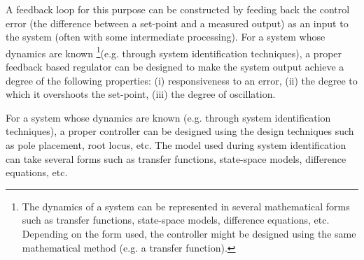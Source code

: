   A feedback loop for this purpose can be constructed by feeding back the control error (the difference between a set-point and a measured output) as an input to the system (often with some intermediate processing). 
For a system whose dynamics are known
\footnote{The dynamics of a system can be represented in several mathematical forms such as transfer functions, state-space models, difference equations, etc. Depending on the form used, the controller might be designed using the same mathematical method (e.g. a transfer function). }(e.g. through system identification techniques), a proper feedback based regulator can be designed to make the system output achieve a degree of the following properties:  
(i) responsiveness to an error, 
(ii) the degree to which it overshoots the set-point, 
(iii) the degree of oscillation. 
    
For a system whose dynamics are known (e.g. through system identification techniques), a proper controller can be designed using the design techniques such as pole placement, root locus, etc. The model used during system identification can take several forms such as transfer functions, state-space models, difference equations, etc.
 
%
%
